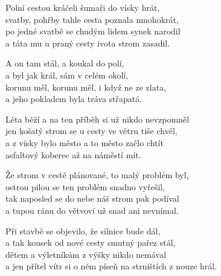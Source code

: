 
\ve{}
Polní cestou kráčeli šumaři do vísky hrát,\\
svatby, pohřby tahle cesta poznala mnohokrát,\\
po jedné svatbě se chudým lidem synek narodil\\
a táta mu u praný cesty ivota strom zasadil.

\cho{}
A on tam stál, a koukal do polí,\\
a byl jak král, sám v celém okolí,\\
korunu měl, korunu měl, i když ne ze zlata,\\
a jeho pokladem byla tráva střapatá. 

\ve{}
Léta běží a na ten příběh si už nikdo nevzpomněl\\
jen košatý strom se u cesty ve větru tiše chvěl,\\
a z vísky bylo město a to město začlo chtít\\
asfaltový koberec až na náměstí mít.

\cho{}

\ve{}
Že strom v cestě plánované, to malý problém byl,\\
ostrou pilou se ten problém snadno vyřešil,\\
tak naposled se do nebe náš strom pak podíval\\
a tupou ránu do větvoví už snad ani nevnímal.

\cho{}

\ve{}
Při stavbě se objevilo, že silnice bude dál,\\
a tak kousek od nové cesty smutný pařez stál,\\
dětem a výletníkům z výšky nikdo nemával\\
a jen přítel vítr si o něm píseň na strništích z nouze hrál.

\cho{}

\esong
